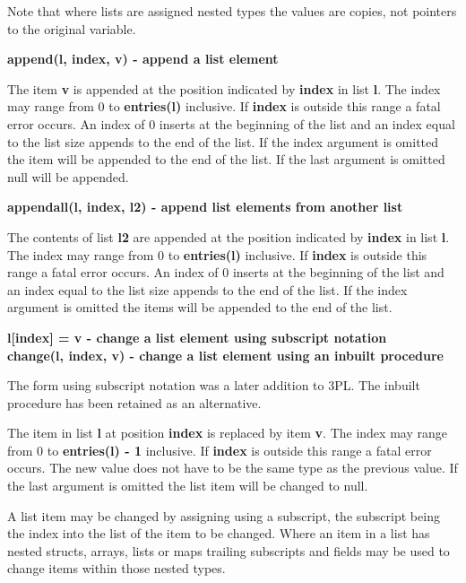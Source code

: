             Note that where lists are assigned nested types the values are copies,
            not pointers to the original variable.
           



            {\bf append(l, index, v) - append a list element}
            
            The item {\bf v} is appended at the position indicated by {\bf
            index} in list {\bf l}. The index may range from 0 to {\bf
            entries(l)} inclusive. If {\bf index} is outside this range a fatal
            error occurs. An index of 0 inserts at the beginning of the list and
            an index equal to the list size appends to the end of the list. If
            the index argument is omitted the item will be appended to the end
            of the list. If the last argument is omitted null will be appended.


            {\bf appendall(l, index, l2) - append list elements from another list}
            
            The contents of list {\bf l2} are appended at the position indicated
            by {\bf index} in list {\bf l}. The index may range from 0 to {\bf
            entries(l)} inclusive. If {\bf index} is outside this range a fatal
            error occurs. An index of 0 inserts at the beginning of the list and
            an index equal to the list size appends to the end of the list. If
            the index argument is omitted the items will be appended to the end
            of the list.


            {\bf l[index] = v - change a list element using subscript notation}\\
            {\bf change(l, index, v) - change a list element using an inbuilt procedure}
            
            The form using subscript notation was a later addition to 3PL.
            The inbuilt procedure has been retained as an alternative.

            The item in list {\bf l} at position {\bf index} is replaced by item
            {\bf v}. The index may range from 0 to {\bf entries(l) - 1}
            inclusive. If {\bf index} is outside this range a fatal error
            occurs. The new value does not have to be the same type as the
            previous value. If the last argument is omitted the list item will
            be changed to null.
            
            A list item may be changed by assigning using a subscript, the
            subscript being the index into the list of the item to be changed.
            Where an item in a list has nested structs, arrays, lists or maps
            trailing subscripts and fields may be used to change items within
            those nested types.
            
